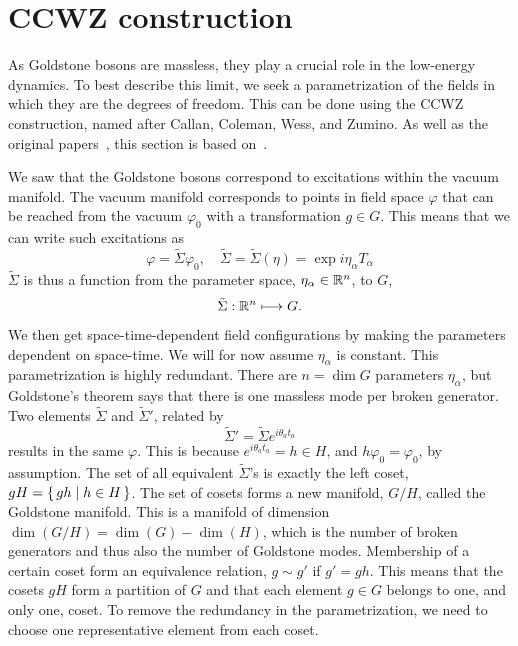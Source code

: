 \section{CCWZ construction}
\label{seciton:ccwz construction}

As Goldstone bosons are massless, they play a crucial role in the low-energy dynamics.
To best describe this limit, we seek a parametrization of the fields in which they are the degrees of freedom.
This can be done using the CCWZ construction, named after Callan, Coleman, Wess, and Zumino.
As well as the original papers~\cite{Structure_of_phen_1,Structure_of_phen_2}, this section is based on~\cite{weinberg_1996_vol2,The_composite_NG_Higgs,effective_FT_with_NG_modes,morrison:ccwz_presentation}.


We saw that the Goldstone bosons correspond to excitations within the vacuum manifold.
The vacuum manifold corresponds to points in field space $\varphi$ that can be reached from the vacuum $\varphi_0$ with a transformation $g \in G$.
This means that we can write such excitations as
\begin{equation}
    \varphi = \tilde\Sigma \varphi_0, \quad \tilde \Sigma = \tilde \Sigma(\eta) = \exp{i \eta_\alpha T_\alpha}
\end{equation}
$\tilde \Sigma$ is thus a function from the parameter space, $\eta_\alpha \in \mathbb{R}^n$, to $G$,
\begin{align}
    \tilde \Sigma: \mathbb{R}^n \longmapsto G.
\end{align}
We then get space-time-dependent field configurations by making the parameters dependent on space-time.
We will for now assume $\eta_\alpha$ is constant.
This parametrization is highly redundant.
There are $n = \dim G$ parameters $\eta_\alpha$, but Goldstone's theorem says that there is one massless mode per broken generator.
Two elements $\tilde\Sigma$ and $\tilde\Sigma'$, related by
\begin{equation}
    \tilde \Sigma' = \tilde\Sigma e^{i \theta_a t_a}
\end{equation}
results in the same $\varphi$.
This is because  $e^{i \theta_a t_a} = h \in H$, and $h \varphi_0 = \varphi_0$, by assumption.
The set of all equivalent $\tilde \Sigma$'s is exactly the left coset, $gH = \left\{\, gh \mid  h \in H \,\right\}$.
The set of cosets forms a new manifold, $G / H$, called the Goldstone manifold.
This is a manifold of dimension $\dim(G/H) = \dim(G) - \dim(H)$, which is the number of broken generators and thus also the number of Goldstone modes.
Membership of a certain coset form an equivalence relation, $g \sim g'$ if $g' = gh$.
This means that the cosets $gH$ form a partition of $G$ and that each element $g \in G$ belongs to one, and only one, coset.
To remove the redundancy in the parametrization, we need to choose one representative element from each coset.

